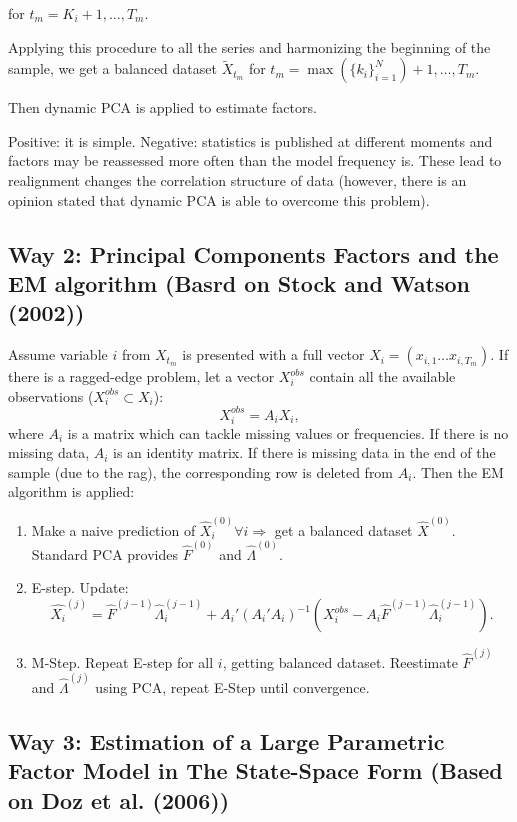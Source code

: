 \documentclass[8pt, a4paper, twocolumn, landscape]{extarticle}
\begin{document}
	for $t_m = K_i + 1, \dots, T_m$.
	
	Applying this procedure to all the series and harmonizing the beginning of the sample, we get a balanced dataset $\tilde{X}_{t_m}$ for $t_m = \max (\{k_i\}^N_{i=1}) + 1, \dots, T_m$.
	
	Then dynamic PCA is applied to estimate factors.
	
	Positive: it is simple. Negative: statistics is published at different moments and factors may be reassessed more often than the model frequency is. These lead to realignment changes the correlation structure of data (however, there is an opinion stated that dynamic PCA is able to overcome this problem).
	
	\subsection{Way 2: Principal Components Factors and the EM algorithm (Basrd on Stock and Watson (2002))}
	
	Assume variable $i$ from $X_{t_m}$ is presented with a full vector $X_i = (x_{i, 1} \dots x_{i, T_m})$. If there is a ragged-edge problem, let a vector $X_i^{obs}$ contain all the available observations ($X_i^{obs} \subset X_i$):
	\[
	X_i^{obs} = A_i X_i,
	\]
	where $A_i$ is a matrix which can tackle missing values or frequencies. If there is no missing data, $A_i$ is an identity matrix. If there is missing data in the end of the sample (due to the rag), the corresponding row is deleted from $A_i$. Then the EM algorithm is applied:
	\begin{enumerate}
		\item Make a naive prediction of $\hat{X}_i^{(0)} \forall i \Rightarrow$ get a balanced dataset $\hat{X}^{(0)}$. Standard PCA provides $\hat{F}^{(0)}$ and $\hat{\Lambda}^{(0)}$.
		\item E-step. Update:
		\[
		\hat{X_i}^{(j)} = \hat{F}^{(j-1)} \hat{\Lambda}_i^{(j-1)} + A_i'(A_i'A_i)^{-1}(X_i^{obs} - A_i \hat{F}^{(j-1)} \hat{\Lambda}_i^{(j-1)}).
		\]
		\item M-Step. Repeat E-step for all $i$, getting balanced dataset. Reestimate $\hat{F}^{(j)}$ and $\hat{\Lambda}^{(j)}$ using PCA, repeat E-Step until convergence.
	\end{enumerate}

	\subsection{Way 3: Estimation of a Large Parametric Factor Model in The State-Space Form (Based on Doz et al. (2006))}
	
\end{document}
